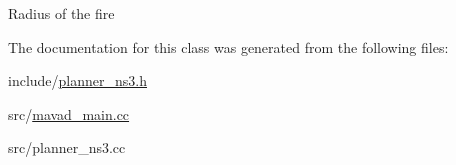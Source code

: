 Radius of the fire 

The documentation for this class was generated from the following files\+:\begin{DoxyCompactItemize}
\item 
include/\hyperlink{planner__ns3_8h}{planner\+\_\+ns3.\+h}\item 
src/\hyperlink{mavad__main_8cc}{mavad\+\_\+main.\+cc}\item 
src/planner\+\_\+ns3.\+cc\end{DoxyCompactItemize}
